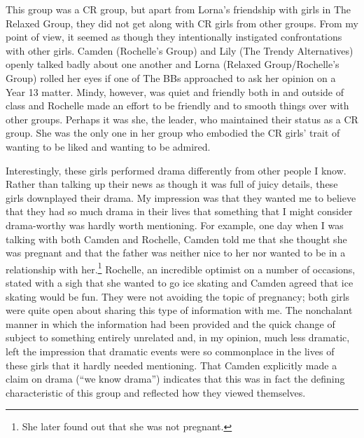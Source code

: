 This group was a CR group, but apart from Lorna's friendship with girls in The Relaxed Group, they did not get along with CR girls from other groups. From my point of view, it seemed as though they intentionally instigated confrontations with other girls. Camden (Rochelle's Group) and Lily (The Trendy Alternatives) openly talked badly about one another and Lorna (Relaxed Group/Rochelle's Group) rolled her eyes if one of The BBs approached to ask her opinion on a Year 13 matter. Mindy, however, was quiet and friendly both in and outside of class and Rochelle made an effort to be friendly and to smooth things over with other groups. Perhaps it was she, the leader, who maintained their status as a CR group. She was the only one in her group who embodied the CR girls' trait of wanting to be liked and wanting to be admired.
 
Interestingly, these girls performed drama differently from other people I know. Rather than talking up their news as though it was full of juicy details, these girls downplayed their drama. My impression was that they wanted me to believe that they had so much drama in their lives that something that I might consider drama-worthy was hardly worth mentioning. For example, one day when I was talking with both Camden and Rochelle, Camden told me that she thought she was pregnant and that the father was neither nice to her nor wanted to be in a relationship with her.\footnote{She later found out that she was not pregnant.}  Rochelle, an incredible optimist on a number of occasions, stated with a sigh that she wanted to go ice skating and Camden agreed that ice skating would be fun. They were not avoiding the topic of pregnancy; both girls were quite open about sharing this type of information with me. The nonchalant manner in which the information had been provided and the quick change of subject to something entirely unrelated and, in my opinion, much less dramatic, left the impression that dramatic events were so commonplace in the lives of these girls that it hardly needed mentioning. That Camden explicitly made a claim on drama (``we know drama'') indicates that this was in fact the defining characteristic of this group and reflected how they viewed themselves.


